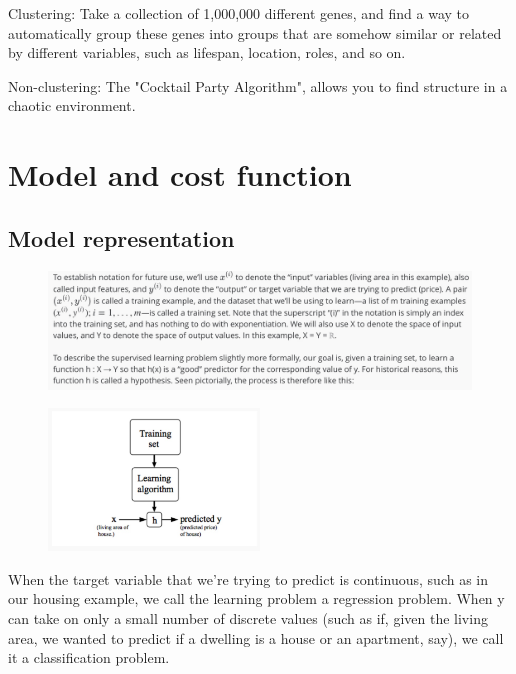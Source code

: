 \documentclass[12pt, A4,onecolumn]{article} %
\begin{document}
Clustering: Take a collection of 1,000,000 different genes, and find a way to automatically group these genes into groups that are somehow similar or related by different variables, such as lifespan, location, roles, and so on.

Non-clustering: The "Cocktail Party Algorithm", allows you to find structure in a chaotic environment. 


\section{Model and cost function}
\subsection{Model representation}
\begin{figure}[H]
	\centering
	\includegraphics[width=1\textwidth]{./Imagenes/modelCost1}
\end{figure}	

\begin{figure}[H]
	\centering
	\includegraphics[width=0.5\textwidth]{./Imagenes/modelCost2}
\end{figure}	
When the target variable that we’re trying to predict is continuous, such as in our housing example, we call the learning problem a regression problem. When y can take on only a small number of discrete values (such as if, given the living area, we wanted to predict if a dwelling is a house or an apartment, say), we call it a classification problem.
\end{document}
